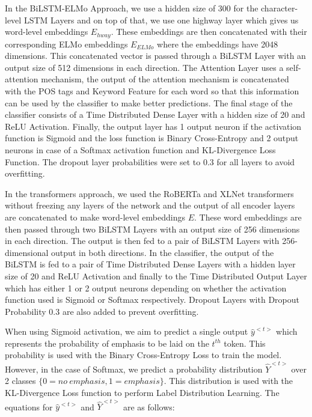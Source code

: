 \documentclass[letterpaper]{article} %
\begin{document}
In the BiLSTM-ELMo Approach, we use a hidden size of 300 for the character-level LSTM Layers and on top of that, we use one highway layer which gives us word-level embeddings $E_{hway}$. These embeddings are then concatenated with their corresponding ELMo embeddings $E_{ELMo}$ where the embeddings have 2048 dimensions. This concatenated vector is passed through a BiLSTM Layer with an output size of 512 dimensions in each direction. The Attention Layer uses a self-attention mechanism, the output of the attention mechanism is concatenated with the POS tags and Keyword Feature for each word so that this information can be used by the classifier to make better predictions. The final stage of the classifier consists of a Time Distributed Dense Layer with a hidden size of 20 and ReLU Activation. Finally, the output layer has 1 output neuron if the activation function is Sigmoid and the loss function is Binary Cross-Entropy and 2 output neurons in case of a Softmax activation function and KL-Divergence Loss Function. The dropout layer probabilities were set to 0.3 for all layers to avoid overfitting.

In the transformers approach, we used the RoBERTa and XLNet transformers without freezing any layers of the network and the output of all encoder layers are concatenated to make word-level embeddings $E$. These word embeddings are then passed through two BiLSTM Layers with an output size of 256 dimensions in each direction. The output is then fed to a pair of BiLSTM Layers with 256-dimensional output in both directions. In the classifier, the output of the BiLSTM is fed to a pair of Time Distributed Dense Layers with a hidden layer size of 20 and ReLU Activation and finally to the Time Distributed Output Layer which has either 1 or 2 output neurons depending on whether the activation function used is Sigmoid or Softmax respectively. Dropout Layers with Dropout Probability 0.3 are also added to prevent overfitting.

When using Sigmoid activation, we aim to predict a single output $\hat{y}^{<t>}$ which represents the probability of emphasis to be laid on the $t^{th}$ token. This probability is used with the Binary Cross-Entropy Loss to train the model. However, in the case of Softmax, we predict a probability distribution $\hat{Y}^{<t>}$ over 2 classes $\{0 = no\:emphasis, 1 = emphasis\}$. This distribution is used with the KL-Divergence Loss function to perform Label Distribution Learning. The equations for $\hat{y}^{<t>}$ and $\hat{Y}^{<t>}$ are as follows:
\end{document}
